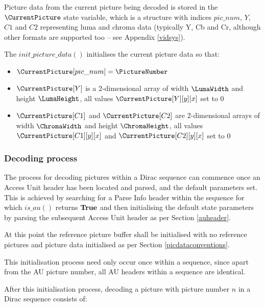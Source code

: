 Picture data from the current picture being decoded is stored in the $\CurrentPicture$ state
variable, which is a structure with indices $pic\_num$, $Y$, $C1$ and $C2$ representing
luma and chroma data (typically Y, Cb and Cr, although other formats are supported too -- see
Appendix \ref{vidsys}).


The $init\_picture\_data()$ initialises the current picture data so that:
\begin{itemize}
\item $\CurrentPicture[pic\_num]=\PictureNumber$
\item $\CurrentPicture[Y]$ is a 2-dimensional array of width $\LumaWidth$ and height $\LumaHeight$, 
all values $\CurrentPicture[Y][y][x]$ set to 0
\item $\CurrentPicture[C1]$ and $\CurrentPicture[C2]$ are 2-dimensional arrays of width $\ChromaWidth$ and height $\ChromaHeight$, 
all values $\CurrentPicture[C1][y][x]$ and $\CurrentPicture[C2][y][x]$ set to 0
\end{itemize}

\subsubsection{Decoding process}
\label{picturedecprocess}

The process for decoding pictures within a Dirac sequence can commence 
once an Access Unit header has been
located and parsed, and the default parameters set. This is achieved by 
searching for a Parse Info header within the sequence for which
$is\_au()$ returns $\text{\bf{True}}$ and then initialising the default state parameters
 by parsing the subsequent Access Unit header as per Section \ref{auheader}.

At this point the reference picture buffer shall be initialised with no 
reference pictures and picture data initialised as per Section \ref{picdataconventions}.

This initialisation process need only occur once within a sequence, since
apart from the AU picture number, all AU headers within a sequence are
identical. 

After this initialisation process, decoding a picture with picture number 
$n$ in a Dirac sequence consists of:

